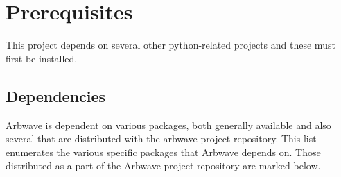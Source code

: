 \thispagestyle{fancy}
\pagestyle{fancy}

\section{Prerequisites}

This project depends on several other python-related projects and these must
first be installed.

\subsection{Dependencies}
Arbwave is dependent on various packages, both generally available and also
several that are distributed with the arbwave project repository.  This list
enumerates the various specific packages that Arbwave depends on.  Those
distributed as a part of the Arbwave project repository are marked below.

